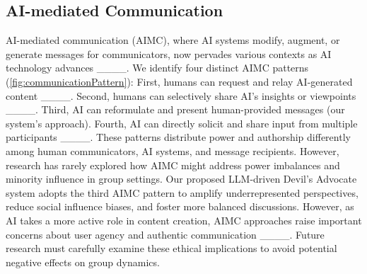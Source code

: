 \subsection{AI-mediated Communication}
AI-mediated communication (AIMC), where AI systems modify, augment, or generate messages for communicators, now pervades various contexts as AI technology advances ____. We identify four distinct AIMC patterns (\autoref{fig:communicationPattern}): First, humans can request and relay AI-generated content ____. Second, humans can selectively share AI's insights or viewpoints ____. Third, AI can reformulate and present human-provided messages (our system's approach). Fourth, AI can directly solicit and share input from multiple participants ____. These patterns distribute power and authorship differently among human communicators, AI systems, and message recipients. However, research has rarely explored how AIMC might address power imbalances and minority influence in group settings. Our proposed LLM-driven Devil's Advocate system adopts the third AIMC pattern to amplify underrepresented perspectives, reduce social influence biases, and foster more balanced discussions. However, as AI takes a more active role in content creation, AIMC approaches raise important concerns about user agency and authentic communication ____. Future research must carefully examine these ethical implications to avoid potential negative effects on group dynamics.